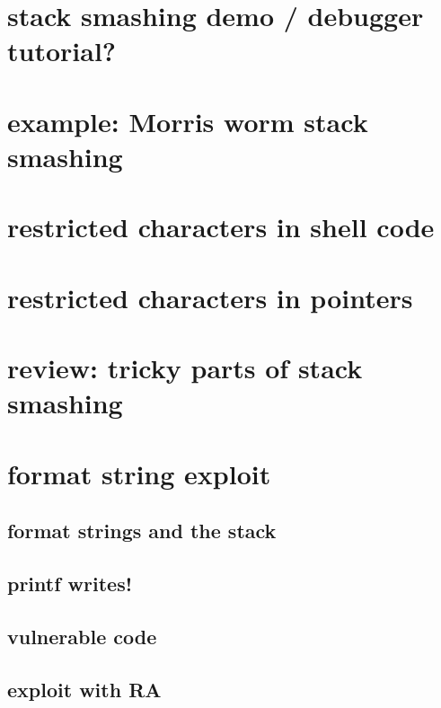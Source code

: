 \section{stack smashing demo / debugger tutorial?}


\section{example: Morris worm stack smashing}



\section{restricted characters in shell code}
   

\section{restricted characters in pointers}


\section{review: tricky parts of stack smashing}


\section{format string exploit}

\subsection{format strings and the stack}


\subsection{printf writes!}


\subsection{vulnerable code}


\subsection{exploit with RA}


